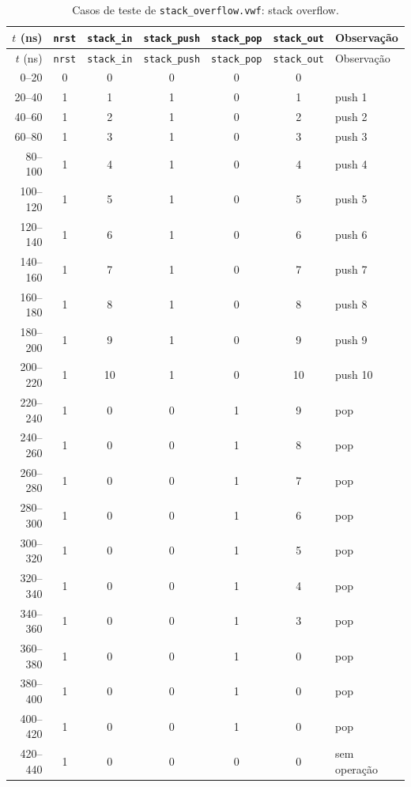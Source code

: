 {\scriptsize\setlength{\tabcolsep}{3pt}
\begin{longtable}{rcccccp{5.7cm}}
\caption{Casos de teste de \texttt{stack\_overflow.vwf}: stack overflow.}
\label{tab:caso-stack-overflow}\\
\hline $t$ (ns) & \texttt{nrst} & \texttt{stack\_in} & \texttt{stack\_push} & \texttt{stack\_pop} & \texttt{stack\_out} & Observação \\ \hline \endfirsthead
\hline $t$ (ns) & \texttt{nrst} & \texttt{stack\_in} & \texttt{stack\_push} & \texttt{stack\_pop} & \texttt{stack\_out} & Observação \\ \hline \endhead
0--20 & 0 & 0 & 0 & 0 & 0 &  \\
20--40 & 1 & 1 & 1 & 0 & 1 & push 1 \\
40--60 & 1 & 2 & 1 & 0 & 2 & push 2 \\
60--80 & 1 & 3 & 1 & 0 & 3 & push 3 \\
80--100 & 1 & 4 & 1 & 0 & 4 & push 4 \\
100--120 & 1 & 5 & 1 & 0 & 5 & push 5 \\
120--140 & 1 & 6 & 1 & 0 & 6 & push 6 \\
140--160 & 1 & 7 & 1 & 0 & 7 & push 7 \\
160--180 & 1 & 8 & 1 & 0 & 8 & push 8 \\
180--200 & 1 & 9 & 1 & 0 & 9 & push 9 \\
200--220 & 1 & 10 & 1 & 0 & 10 & push 10 \\
220--240 & 1 & 0 & 0 & 1 & 9 & pop \\
240--260 & 1 & 0 & 0 & 1 & 8 & pop \\
260--280 & 1 & 0 & 0 & 1 & 7 & pop \\
280--300 & 1 & 0 & 0 & 1 & 6 & pop \\
300--320 & 1 & 0 & 0 & 1 & 5 & pop \\
320--340 & 1 & 0 & 0 & 1 & 4 & pop \\
340--360 & 1 & 0 & 0 & 1 & 3 & pop \\
360--380 & 1 & 0 & 0 & 1 & 0 & pop \\
380--400 & 1 & 0 & 0 & 1 & 0 & pop \\
400--420 & 1 & 0 & 0 & 1 & 0 & pop \\
420--440 & 1 & 0 & 0 & 0 & 0 & sem operação \\
\hline
\end{longtable}}
\vspace{-0.9cm}
